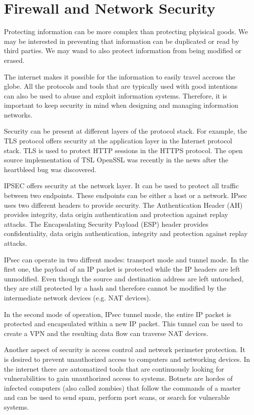 \chapter{Firewall and Network Security}

Protecting information can be more complex than protecting phyisical goods.
We may be interested in preventing that information can be duplicated or read by third parties.
We may wand to also protect information from being modified or erased.

The internet makes it possible for the information to easily travel accross the globe.
All the protocols and tools that are typically used with good intentions can also be used to abuse and exploit information systems.
Therefore, it is important to keep security in mind when designing and managing information networks.

Security can be present at different layers of the protocol stack.
For example, the TLS protocol offers security at the application layer in the Internet protocol stack.
TLS is used to protect HTTP sessions in the HTTPS protocol. 
The open source implementation of TSL OpenSSL was recently in the news after the heartbleed bug was discovered.

IPSEC offers security at the network layer.
It can be used to protect all traffic between two endpoints.
These endpoints can be either a host or a network.
IPsec uses two different headers to provide security.
The Authentication Header (AH) provides integrity, data origin authentication and protection against replay attacks.
The Encapsulating Security Payload (ESP) header provides confidentiality, data origin authentication, integrity and protection against replay attacks.

IPsec can operate in two diffrent modes: transport mode and tunnel mode.
In the first one, the payload of an IP packet is protected while the IP headers are left unmodified.
Even though the source and destination address are left untouched, they are still protected by a hash and therefore cannot be modified by the intermediate network devices (e.g. NAT devices).

In the second mode of operation, IPsec tunnel mode, the entire IP packet is protected and encapsulated within a new IP packet.
This tunnel can be used to create a VPN and the resulting data flow can traverse NAT devices.

Another aspect of security is access control and network perimeter protection.
It is desired to prevent unauthorized access to computers and networking devices.
In the internet there are automatized tools that are continuously looking for vulnerabilities to gain unauthorized access to systems.
Botnets are hordes of infected computers (also called zombies) that follow the commands of a master and can be used to send spam, perform port scans, or search for vulnerable systems.

